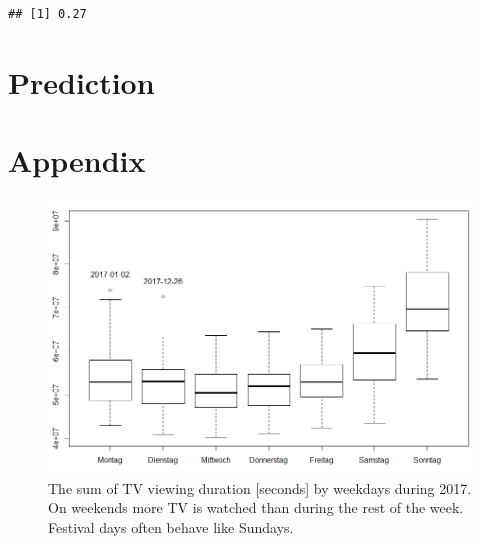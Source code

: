 \documentclass[]{article}
\newenvironment{Shaded}{\begin{snugshade}}{\end{snugshade}}
\newcommand{\KeywordTok}[1]{\textcolor[rgb]{0.13,0.29,0.53}{\textbf{#1}}}
\newcommand{\DataTypeTok}[1]{\textcolor[rgb]{0.13,0.29,0.53}{#1}}
\newcommand{\DecValTok}[1]{\textcolor[rgb]{0.00,0.00,0.81}{#1}}
\newcommand{\StringTok}[1]{\textcolor[rgb]{0.31,0.60,0.02}{#1}}
\newcommand{\OtherTok}[1]{\textcolor[rgb]{0.56,0.35,0.01}{#1}}
\newcommand{\ControlFlowTok}[1]{\textcolor[rgb]{0.13,0.29,0.53}{\textbf{#1}}}
\newcommand{\OperatorTok}[1]{\textcolor[rgb]{0.81,0.36,0.00}{\textbf{#1}}}
\newcommand{\NormalTok}[1]{#1}
\begin{document}
\begin{Shaded}
\end{Shaded}

\begin{verbatim}
## [1] 0.27
\end{verbatim}

\section{Prediction}\label{prediction}

\section{Appendix}\label{appendix}

\begin{figure}[H]

{\centering \includegraphics[width=0.75\linewidth]{../data/tv-week} 

}

\caption{\label{fig:fig1}The sum of TV viewing duration [seconds] by weekdays during 2017. On weekends more TV is watched than during the rest of the week. Festival days often behave like Sundays.}\label{fig:fig1}
\end{figure}
\end{document}
